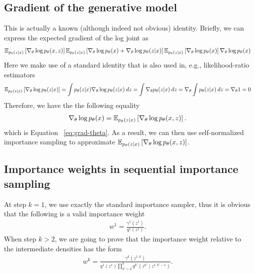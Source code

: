 \documentclass[anonymous=false, %
               format=acmsmall, %
               review=true, %
               screen=true, %
               nonacm=true]{acmart}
\theoremstyle{definition}
\begin{document}
\subsection{Gradient of the generative model}%
\label{appendix:grad-theta}
This is actually a known (although indeed not obvious) identity. Briefly, we can express the expected gradient of the log joint as
\begin{align*}
    \mathbb{E}_{p_\theta(z | x)} 
    \left[
    \nabla_\theta \log p_\theta(x, z)
    \right]
    \mathbb{E}_{p_\theta(z | x)} 
    \left[
    \nabla_\theta \log p_\theta(x) + \nabla_\theta \log p_\theta(z | x)
    \right]
    \mathbb{E}_{p_\theta(z | x)} 
    \left[
    \nabla_\theta \log p_\theta(x) 
    \right]
    \nabla_\theta \log p_\theta(x)
\end{align*}
Here we make use of a standard identity that is also used in, e.g., likelihood-ratio estimators
\begin{align*}
\mathbb{E}_{p_\theta(z | x)}
\left[
    \nabla_\theta \log p_\theta(z | x)
\right] 
=
\int p_\theta(z | x) \nabla_\theta \log p_\theta(z | x) \: dz
=
\int \nabla_\theta p_\theta(z | x) \: dz
=
\nabla_\theta \int p_\theta(z | x) \: dz
=
\nabla_\theta 1
= 
0
\end{align*}
Therefore, we have the the following equality
\begin{align*}
\nabla_\theta \log p_\theta(x) 
= 
\mathbb{E}_{p_\theta(z | x)} 
\left[
\nabla_\theta \log p_\theta(x, z)
\right].
\end{align*}
which is Equation ~\ref{eq:grad-theta}. As a result, we can then use self-normalized importance sampling to approximate     $\mathbb{E}_{p_\theta(z | x)} \left[\nabla_\theta \log p_\theta(x, z) \right]$.

\subsection{Importance weights in sequential importance sampling}
\label{appendix:sis-weight}
At step $k=1$, we use exactly the standard importance sampler, thus it is obvious that the following is a valid importance weight
\begin{align*}
    w^1 = \frac{\gamma^1(z^1)}{q^1(z^1)}.
\end{align*}
When step $k>2$, we are going to prove that the importance weight relative to the intermediate densities has the form
\begin{align}
    \label{appendix:eq:sis-weight}
    w^k
    = 
    \frac{\gamma^k(z^{1:k})}
         {q^1(z^1) \prod_{k'=2}^k q^{k'}(z^{k'} \mid z^{1:k'-1})}.
\end{align}
\end{document}

